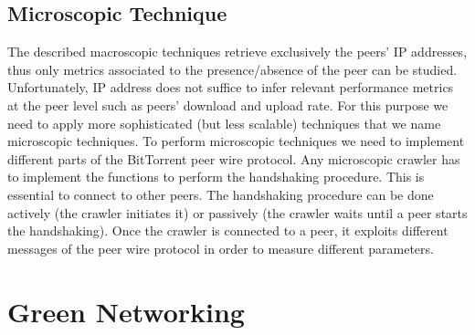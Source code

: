 \subsection{Microscopic Technique}
The described macroscopic techniques retrieve exclusively the peers’ IP addresses, thus only metrics associated to the presence/absence of the peer can be studied. Unfortunately, IP address does not suffice to infer relevant performance metrics at the peer level such as peers’ download and upload rate. 
For this purpose we need to apply more sophisticated (but less scalable) techniques that we name microscopic techniques.
To perform microscopic techniques we need to implement different parts of the BitTorrent peer wire protocol. 
Any microscopic crawler has to implement the functions to perform the handshaking procedure. 
This is essential to connect to other peers. 
The handshaking procedure can be done actively (the crawler initiates it) or passively (the crawler waits until a peer starts the handshaking). 
Once the crawler is connected to a peer, it exploits different messages of the peer wire protocol in order to measure different parameters. 


\section{Green Networking}

